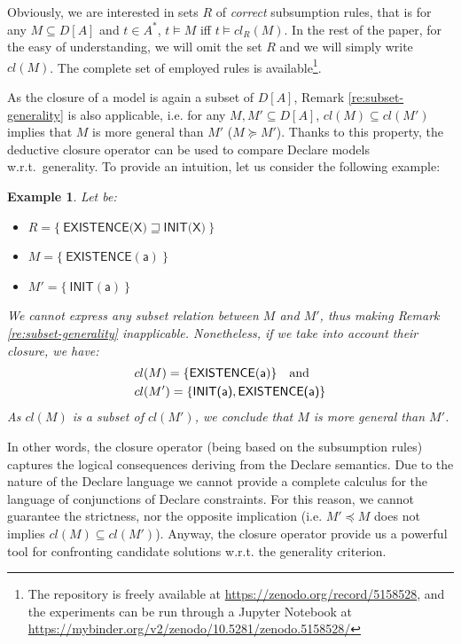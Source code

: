 \documentclass[a4wide,11pt]{article}
\newcommand{\tcolor}[2]{\color{#1}{#2}\color{black}}
\theoremstyle{definition}
\newtheorem{lemma}{Lemma}[section]
\theoremstyle{plain}
\newtheorem{example}{Example}[section]
\begin{document}
\noindent Obviously, we are interested in sets $R$ of \emph{correct} subsumption rules, that is for any $M\subseteq D[A]$ and $t\in A^*$, $t\models M$ iff $t\models cl_R(M)$. In the rest of the paper, for the easy of understanding, we will omit the set $R$ and we will simply write $cl(M)$. The complete set of employed rules is available\footnote{The repository is freely available at \url{https://zenodo.org/record/5158528}, and the experiments can be run through a Jupyter Notebook at \url{https://mybinder.org/v2/zenodo/10.5281/zenodo.5158528/}}.


As the closure of a model is again a subset of $D[A]$, Remark \ref{re:subset-generality} is also applicable, i.e. for any $M, M'\subseteq D[A]$, $cl(M)\subseteq cl(M')$ implies that $M$ is more general than $M'$ ($M\succeq M'$).
%
%
Thanks to this property, the deductive closure operator can be used to compare Declare models w.r.t.~generality. To provide an intuition, let us consider the following example:

\begin{example}
Let be:
\begin{itemize}
\item $R=\{\ \textsf{EXISTENCE(X)} \sqsupseteq \textsf{INIT(X)}\ \}$
\item $M = \{\ \mathsf{EXISTENCE(a)}\ \}$
\item $M' = \{\ \mathsf{INIT(a)}\ \}$
\end{itemize}
We cannot express any subset relation between $M$ and $M'$, thus making Remark \ref{re:subset-generality} inapplicable.
Nonetheless, if we take into account their closure, we have:
\begin{align*}
	& cl(M)=\{\mathsf{EXISTENCE(a)}\}\quad \textnormal{and} \\
	& cl(M')=\{\textsf{INIT(a)}, \textsf{EXISTENCE(a)}\}
\end{align*}
As $cl(M)$ is a subset of $cl(M')$, we conclude that $M$ is more general than $M'$.
\end{example}
%
\noindent In other words, the closure operator (being based on the subsumption rules) captures the logical consequences deriving from the Declare semantics.
Due to the nature of the Declare language we cannot provide a complete calculus for the language of conjunctions of Declare constraints. For this reason, we cannot guarantee the strictness, nor the opposite implication (i.e. $M'\preceq M$ does not implies $cl(M)\subseteq cl(M')$). Anyway, the closure operator provide us a powerful tool for confronting candidate solutions w.r.t. the generality criterion.
\end{document}
